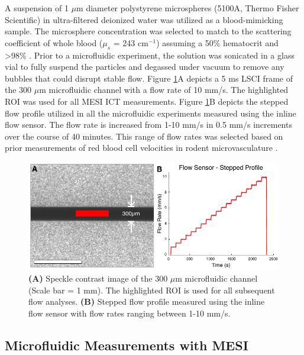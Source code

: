 A suspension of 1 $\mu$m diameter polystyrene microspheres (5100A, Thermo Fisher Scientific) in ultra-filtered deionized water was utilized as a blood-mimicking sample. The microsphere concentration was selected to match to the scattering coefficient of whole blood ($\mu_s$ = 243 cm$^{-1}$) assuming a 50\% hematocrit and  \textgreater 98\% \cite{Yaroslavsky:2002tg}. Prior to a microfluidic experiment, the solution was sonicated in a glass vial to fully suspend the particles and degassed under vacuum to remove any bubbles that could disrupt stable flow. Figure \ref{fig:microfluidic}A depicts a 5 ms LSCI frame of the 300 $\mu$m microfluidic channel with a flow rate of 10 mm/s. The highlighted ROI was used for all MESI ICT measurements. Figure \ref{fig:microfluidic}B depicts the stepped flow profile utilized in all the microfluidic experiments measured using the inline flow sensor. The flow rate is increased from 1-10 mm/s in 0.5 mm/s increments over the course of 40 minutes. This range of flow rates was selected based on prior measurements of red blood cell velocities in rodent microvasculature \cite{Tomita:2008do}.

\begin{figure}
    \includegraphics{figures/chapter_4/microfluidic.pdf}
    \caption{
        \label{fig:microfluidic}
        \textbf{(A)} Speckle contrast image of the 300 $\mu$m microfluidic channel (Scale bar = 1 mm). The highlighted ROI is used for all subsequent flow analyses. \textbf{(B)} Stepped flow profile measured using the inline flow sensor with flow rates ranging between 1-10 mm/s.
    }
\end{figure}

\subsection{Microfluidic Measurements with MESI}

